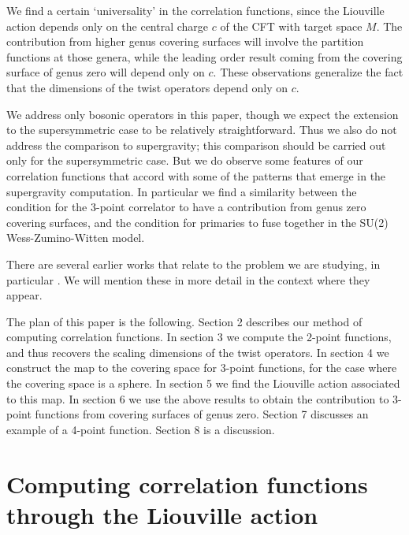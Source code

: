 \documentclass[12pt]{article}
\begin{document}
We find a certain `universality' in the correlation functions, since the
Liouville action depends only on the central charge $c$ of the CFT with target
space $M$. The contribution from higher genus covering surfaces will involve
the partition functions at those genera, while the leading order result coming
from the covering surface of genus zero will depend only on $c$. These
observations generalize the fact that the dimensions of the twist
operators depend only on $c$.

    We address only bosonic operators in this paper, though we
expect the extension to the supersymmetric case to be
relatively straightforward.  Thus we
also do not address  the comparison to  supergravity; this comparison
should be carried out only for the supersymmetric case. But we do observe
some features of our  correlation functions that accord with some of 
the patterns that
emerge in the supergravity computation.  In particular we find a similarity
between the condition for the 3-point correlator to have a contribution from
genus zero covering surfaces, and the condition for primaries to fuse
together in the SU(2) Wess-Zumino-Witten model.

There are several earlier works that relate to the problem we are studying, in
particular \cite{vafaone,  frolov, bantay, jevicki, mihailescu, halpern}. We will
mention these in more detail in
the context where they appear.


The plan of this paper is the following. Section 2 describes our method of
computing correlation functions.  In section 3  we compute the 
2-point functions,
and thus recovers the scaling dimensions of the twist operators.  In section 4
we construct the map to the covering space for 3-point functions, for
the case where the covering space is a sphere.  In section 5 we find the
Liouville action associated to this map. In section 6 we use the above results
to obtain the contribution to 3-point functions from covering surfaces of
genus zero. Section 7 discusses an example of a 4-point function.
Section 8 is a
discussion.











\section{Computing correlation functions through the Liouville action}
\renewcommand{\theequation}{2.\arabic{equation}}
\setcounter{equation}{0}
\end{document}
